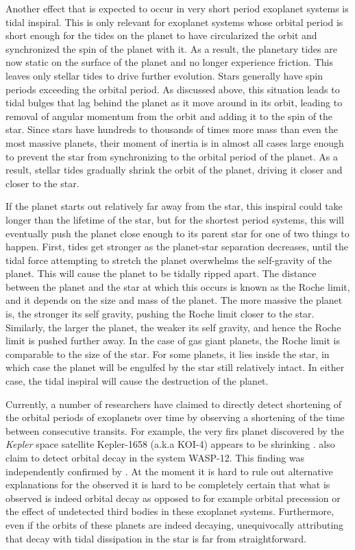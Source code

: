 Another effect that is expected to occur in very short period exoplanet systems
is tidal inspiral. This is only relevant for exoplanet systems whose orbital
period is short enough for the tides on the planet to have circularized the
orbit and synchronized the spin of the planet with it. As a result, the
planetary tides are now static on the surface of the planet and no longer
experience friction. This leaves only stellar tides to drive further evolution.
Stars generally have spin periods exceeding the orbital period. As discussed
above, this situation leads to tidal bulges that lag behind the planet as it
move around in its orbit, leading to removal of angular momentum from the orbit
and adding it to the spin of the star. Since stars have hundreds to thousands of
times more mass than even the most massive planets, their moment of inertia is
in almost all cases large enough to prevent the star from synchronizing to the
orbital period of the planet. As a result, stellar tides gradually shrink the
orbit of the planet, driving it closer and closer to the star.

If the planet starts out relatively far away from the star, this inspiral could
take longer than the lifetime of the star, but for the shortest period systems,
this will eventually push the planet close enough to its parent star for one of
two things to happen. First, tides get stronger as the planet-star separation
decreases, until the tidal force attempting to stretch the planet overwhelms the
self-gravity of the planet. This will cause the planet to be tidally ripped
apart. The distance between the planet and the star at which this occurs is
known as the Roche limit, and it depends on the size and mass of the planet. The
more massive the planet is, the stronger its self gravity, pushing the Roche
limit closer to the star.  Similarly, the larger the planet, the weaker its self
gravity, and hence the Roche limit is pushed further away. In the case of gas
giant planets, the Roche limit is comparable to the size of the star. For some
planets, it lies inside the star, in which case the planet will be engulfed by
the star still relatively intact. In either case, the tidal inspiral will cause
the destruction of the planet.

Currently, a number of researchers have claimed to directly detect shortening of
the orbital periods of exoplanets over time by observing a shortening of the
time between consecutive transits. For example, the very firs planet discovered
by the \textit{Kepler} space satellite Kepler-1658 (a.k.a KOI-4) appears to be
shrinking \citep{Vissapragada_et_al_22}. \citet{Maciejewski_et_al_16} also claim
to detect orbital decay in the system WASP-12. This finding was independently
confirmed by \citet{Patra_et_al_17}. At the moment it is hard to rule out
alternative explanations for the observed it is hard to be completely certain
that what is observed is indeed orbital decay as opposed to for example orbital
precession or the effect of undetected third bodies in these exoplanet systems.
Furthermore, even if the orbits of these planets are indeed decaying,
unequivocally attributing that decay with tidal dissipation in the star is far
from straightforward.

